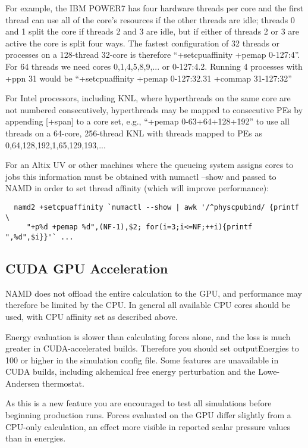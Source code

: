 For example, the IBM POWER7 has four hardware threads per core and the
first thread can use all of the core's resources if the other threads are
idle; threads 0 and 1 split the core if threads 2 and 3 are idle, but
if either of threads 2 or 3 are active the core is split four ways.  The
fastest configuration of 32 threads or processes on a 128-thread 32-core
is therefore ``+setcpuaffinity +pemap 0-127:4''.  For 64 threads we need
cores 0,1,4,5,8,9,... or 0-127:4.2.  Running 4 processes with +ppn 31
would be ``+setcpuaffinity +pemap 0-127:32.31 +commap 31-127:32''

For Intel processors, including KNL, where hyperthreads on the same core
are not numbered consecutively, hyperthreads may be mapped to consecutive
PEs by appending [+span] to a core set, e.g., ``+pemap 0-63+64+128+192''
to use all threads on a 64-core, 256-thread KNL with threads mapped to
PEs as 0,64,128,192,1,65,129,193,...

For an Altix UV or other machines where the queueing system assigns cores
to jobs this information must be obtained with numactl --show and passed
to NAMD in order to set thread affinity (which will improve performance):

\begin{verbatim}
  namd2 +setcpuaffinity `numactl --show | awk '/^physcpubind/ {printf \
     "+p%d +pemap %d",(NF-1),$2; for(i=3;i<=NF;++i){printf ",%d",$i}}'` ...
\end{verbatim}

\subsection{CUDA GPU Acceleration}

NAMD does not offload the entire calculation to the GPU, and performance
may therefore be limited by the CPU.  In general all available CPU cores
should be used, with CPU affinity set as described above.

Energy evaluation is slower than calculating forces alone, and the loss
is much greater in CUDA-accelerated builds.  Therefore you should set
outputEnergies to 100 or higher in the simulation config file.  Some
features are unavailable in CUDA builds, including alchemical free
energy perturbation and the {Lowe-Andersen} thermostat.

As this is a new feature you are encouraged to test all simulations
before beginning production runs.  Forces evaluated on the GPU differ
slightly from a CPU-only calculation, an effect more visible in reported
scalar pressure values than in energies.


